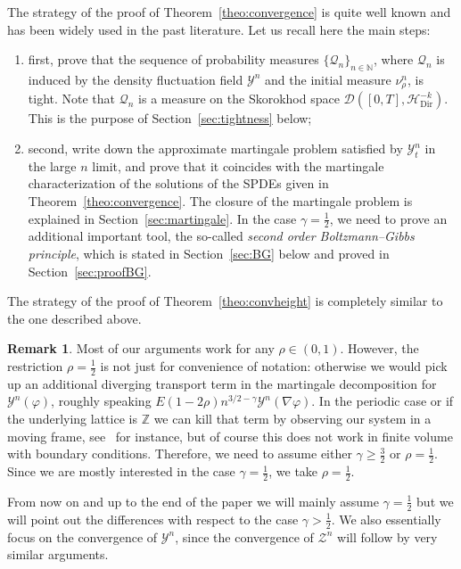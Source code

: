 \documentclass[10pt]{amsart}
\theoremstyle{definition}\newtheorem{defi}[theo]{Definition}\newtheorem{rema}[theo]{Remark}\newtheorem{exam}[theo]{Example}\newtheorem{exem}[theo]{Example}\newtheorem{nota}[theo]{Notation}
\newcommand{\bb}[1]{{\mathbb #1}}
\newcommand{\mc}[1]{{\mathcal #1}}
\renewcommand{\mc}[1]{{\mathcal #1}}
\renewcommand{\ge}{\geqslant}
\renewcommand{\tfrac}{\frac}
\begin{document}
The strategy of the proof of Theorem~\ref{theo:convergence} is quite well known and has been widely used in the past literature. Let us recall here the main steps:
\begin{enumerate}
\item first, prove that the sequence of probability measures $\{\mc Q_n\}_{n\in\bb N}$, where $\mc Q_n$ is induced by the density fluctuation field $\mc Y^n$ and the initial measure $\nu^n_\rho$, is tight. Note that $\mc Q_n$ is a measure on the Skorokhod space $\mc D([0,T],\mc H_{\mathrm{Dir}}^{-k})$. This is the purpose of Section~\ref{sec:tightness} below;
\item second, write down the approximate martingale problem satisfied by $\mc Y_t^n$ in the large $n$ limit, and prove that it coincides with the martingale characterization of the solutions of the SPDEs given in Theorem~\ref{theo:convergence}. The closure of the martingale problem is explained in Section~\ref{sec:martingale}. In the case $\gamma=\frac12$, we need to prove an additional important tool, the so-called \emph{second order Boltzmann--Gibbs principle}, which is stated in Section~\ref{sec:BG} below and proved in Section~\ref{sec:proofBG}.
\end{enumerate}

The strategy of the proof of Theorem~\ref{theo:convheight} is completely similar to the one described above.



\begin{rema}\label{rem:rho}
Most of our arguments work for any $\rho \in (0,1)$. However, the restriction $\rho=\tfrac12$ is not just for convenience of notation: otherwise we would pick up an additional diverging transport term in the martingale decomposition for $\mc Y^n(\varphi)$, roughly speaking $E(1-2\rho)n^{3/2-\gamma} \mc Y^n(\nabla\varphi)$. In the periodic case or if the underlying lattice is $\bb Z$ we can kill that term by observing our system in a moving frame, see~\cite{gj2014} for instance, but of course this does not work in finite volume with boundary conditions. Therefore, we need to assume either $\gamma \ge \tfrac32$ or $\rho=\tfrac12$. Since we are mostly interested in the case $\gamma = \tfrac12$, we take $\rho=\tfrac12$.
\end{rema}


From now on and up to the end of the paper we will mainly assume $\gamma=\frac12$ but we will point out the differences with respect to the case $\gamma>\frac12$. We also essentially focus on the convergence of $\mc Y^n$, since the convergence of $\mc Z^n$ will follow by very similar arguments.
\end{document}
